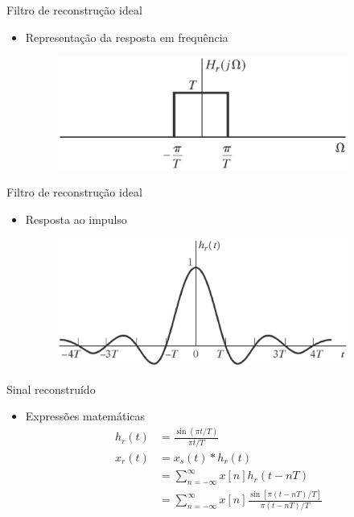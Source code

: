 \begin{slide}{Filtro de reconstru\c c\~ao ideal}
\begin{itemize}
   \item Representação da resposta em frequência
   \begin{figure}
      \centering
      \includegraphics[width=0.9\textwidth]{figs/filtroreconstr.eps}
   \end{figure}
\end{itemize}
\end{slide}

\begin{slide}{Filtro de reconstru\c c\~ao ideal}
\begin{itemize}
   \item Resposta ao impulso
   \begin{figure}
      \centering
      \includegraphics[width=0.9\textwidth]{figs/filtroreconstr01.eps}
   \end{figure}
\end{itemize}
\end{slide}

\begin{slide}{Sinal reconstru\'ido}
\begin{itemize}
   \item Expressões matemáticas
   \begin{align}
      h_r(t) &= \frac{\sin(\pi t/T)}{\pi t/T}\\
      x_r(t) &= x_s(t)*h_r(t)\\
             &= \sum_{n=-\infty}^{\infty}x[n]h_r(t-nT)\\
             &= \sum_{n=-\infty}^{\infty}x[n]\frac{\sin[\pi (t-nT)/T]}{\pi (t-nT)/T}
   \end{align}
\end{itemize}
\end{slide}

